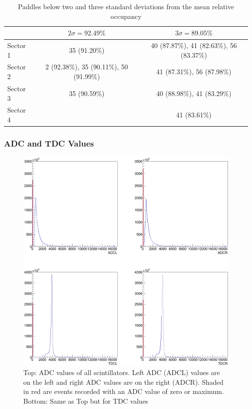 \begin{table}
\begin{tabular}{l | c | c |}
 &  $2 \sigma = 92.49\%$ &  $3 \sigma = 89.05\%$ \\ 
\hline
Sector 1 & 35 (91.20\%) & 40 (87.87\%), 41 (82.63\%), 56 (83.37\%) \\
Sector 2 & 2 (92.38\%), 35 (90.11\%), 50 (91.99\%) &  41 (87.31\%), 56 (87.98\%)\\
Sector 3 & 35 (90.59\%) & 40 (88.98\%), 41 (83.29\%)\\
Sector 4 &  & 41 (83.61\%) \\
\end{tabular}
\caption{Paddles below two and three standard deviations from the mean relative occupancy}
\label{tab:occp}
\end{table}

\subsubsection{ADC and TDC Values}


\begin{figure}
    \includegraphics[width=0.70\linewidth]{figures/calib/tof/tofko/adctdcval.eps}
    \caption{Top: ADC values of all scintillators. Left ADC (ADCL) values are on the left and right ADC values are on the right (ADCR). Shaded in red are events recorded with an ADC value of zero or maximum. Bottom: Same as Top but for TDC values}
    \label{plt:adctdcval}
\end{figure}


